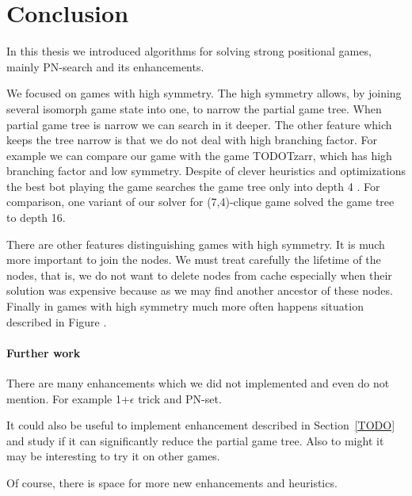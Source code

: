 \chapter*{Conclusion}

In this thesis we introduced algorithms for solving strong positional games,
mainly PN-search and its enhancements.

We focused on games with high symmetry. The high symmetry allows,
by joining several isomorph game state into one, to narrow the
partial game tree. When partial game tree is narrow we can
search in it deeper. The other feature which keeps the tree narrow is that we do
not deal with high branching factor. For example we can compare
our game with the game TODO{Tzarr},
which has high branching factor and low symmetry. Despite of
clever heuristics and optimizations the best bot playing the game searches the game tree
only into depth 4 . For comparison, one variant of our solver 
for (7,4)-clique game solved the game tree to depth 16.

There are other features distinguishing games with high symmetry. It is much
more important to join the nodes. We must treat carefully the lifetime of
the nodes, that is, we do not want to delete nodes from cache especially when their
solution was expensive because as we may find another ancestor of these nodes.
Finally in games with high symmetry much more often happens situation described
in Figure .

\subsubsection{Further work}

There are many enhancements which we did not implemented and even do
not mention. For example 1+$\epsilon$ trick \cite{TODO} and PN-set.

It could also be useful to implement enhancement  described
in Section~\ref{TODO} and study if it can significantly reduce the partial game
tree. Also to might it may be interesting to try it on other games.

Of course, there is space for more new enhancements and heuristics. 



